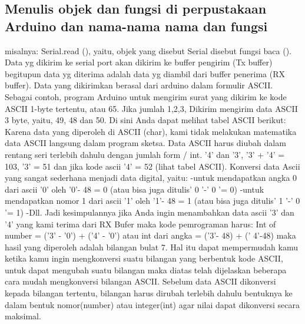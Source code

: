 \subsection {Menulis objek dan fungsi di perpustakaan Arduino dan nama-nama nama dan fungsi}
misalnya: Serial.read (), yaitu, objek yang disebut Serial disebut fungsi baca ().
Data yg dikirim  ke serial port  akan dikirim ke buffer pengirim (Tx buffer)  begitupun data yg diterima  adalah data yg diambil  dari  buffer penerima (RX buffer). Data yang dikirimkan berasal dari arduino dalam formulir ASCII. Sebagai contoh, program Arduino untuk mengirim surat yang dikirim ke kode ASCII 1-byte tertentu, atau 65. Jika jumlah 1,2,3, Dikirim mengirim data ASCII 3 byte, yaitu, 49, 48 dan 50. Di sini Anda dapat melihat tabel ASCII berikut:
Karena data yang diperoleh di ASCII (char), kami tidak melakukan matematika data ASCII langsung dalam program sketsa. Data ASCII harus diubah dalam rentang seri terlebih dahulu dengan jumlah form / int. '4' dan '3', '3' + '4' = 103, '3' = 51 dan jika kode ascii '4' = 52 (lihat tabel ASCII).
Konversi data Ascii yang sangat sederhana menjadi data digital, yaitu:
-untuk mendapatkan angka 0 dari ascii '0' oleh '0'- 48 = 0 (atau bisa juga ditulis' 0 '-' 0 '= 0)
-untuk mendapatkan nomor 1 dari ascii '1' oleh '1'- 48 = 1 (atau bisa juga ditulis' 1 '-' 0 '= 1)
-Dll.
Jadi kesimpulannya jika Anda ingin menambahkan data ascii '3' dan '4' yang kami terima dari RX Bufer maka kode pemrograman harus:
Int of number = ('3' - '0') + ('4' - '0') atau
int dari angka = ('3'- 48) + (' 4'-48) maka hasil yang diperoleh adalah bilangan bulat 7.
Hal itu dapat mempermudah kamu ketika kamu ingin mengkonversi suatu bilangan yang berbentuk kode ASCII, untuk dapat mengubah suatu bilangan maka diatas telah dijelaskan beberapa cara mudah mengkonversi bilangan ASCII. Sebelum data ASCII dikonversi kepada bilangan tertentu, bilangan harus dirubah terlebih dahulu bentuknya ke dalam bentuk nomor(number) atau integer(int) agar nilai dapat dikonversi secara maksimal.

